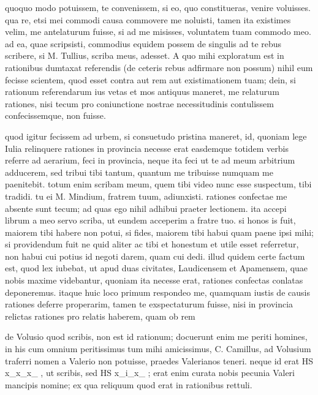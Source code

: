 


 quoquo modo potuissem, te convenissem, si eo, quo constitueras, venire voluisses. qua re, etsi mei commodi causa commovere me noluisti, tamen ita existimes velim, me antelaturum fuisse, si ad me misisses, voluntatem tuam commodo meo. ad ea, quae scripsisti, commodius equidem possem de singulis ad te rebus scribere, si M. Tullius, scriba meus, adesset. A quo mihi exploratum est in rationibus dumtaxat referendis (de ceteris rebus adfirmare non possum) nihil eum fecisse scientem, quod esset contra aut rem aut existimationem tuam; dein, si rationum referendarum ius vetas et mos antiquus maneret, me relaturum rationes, nisi tecum pro coniunctione nostrae necessitudinis contulissem confecissemque, non fuisse.

 quod igitur fecissem ad urbem, si consuetudo pristina maneret, id, quoniam lege Iulia relinquere rationes in provincia necesse erat easdemque totidem verbis referre ad aerarium, feci in provincia, neque ita feci ut te ad meum arbitrium adducerem, sed tribui tibi tantum, quantum me tribuisse numquam me paenitebit. totum enim scribam meum, quem tibi video nunc esse suspectum, tibi tradidi. tu ei M. Mindium, fratrem tuum, adiunxisti. rationes confectae me absente sunt tecum; ad quas ego nihil adhibui praeter lectionem. ita accepi librum a meo servo scriba, ut eundem acceperim a fratre tuo. si honos is fuit, maiorem tibi habere non potui, si fides, maiorem tibi habui quam paene ipsi mihi; si providendum fuit ne quid aliter ac tibi et honestum et utile esset referretur, non habui cui potius id negoti darem, quam cui dedi. illud quidem certe factum est, quod lex iubebat, ut apud duas civitates, Laudicensem et Apamensem, quae nobis maxime videbantur, quoniam ita necesse erat, rationes confectas conlatas deponeremus. itaque huic loco primum respondeo me, quamquam iustis de causis rationes deferre properarim, tamen te exspectaturum fuisse, nisi in provincia relictas rationes pro relatis haberem, quam ob rem

 de Volusio quod scribis, non est id rationum; docuerunt enim me periti homines, in his cum omnium peritissimus tum mihi amicissimus, C. Camillus, ad Volusium traferri nomen a Valerio non potuisse, praedes Valerianos teneri. neque id erat HS x_x_x_ , ut scribis, sed HS x_i_x_ ; erat enim curata nobis pecunia Valeri mancipis nomine; ex qua reliquum quod erat in rationibus rettuli.

